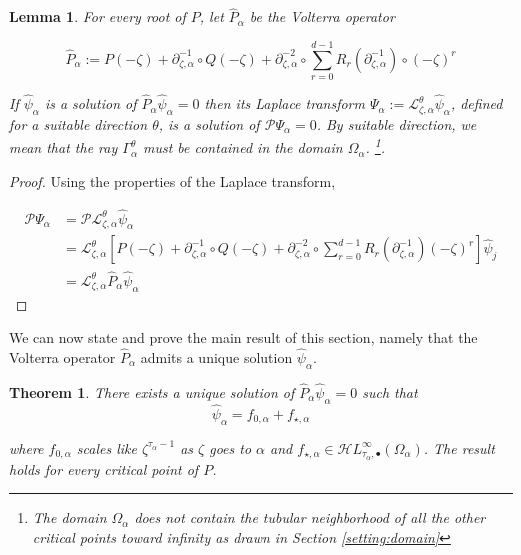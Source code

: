 \documentclass{article}
\theoremstyle{plain}
\newtheorem{lemma}{Lemma}
\newtheorem{thm}{Theorem}
\newcommand{\laplace}{\mathcal{L}}
\newcommand{\fracderiv}[3]{\partial^{#1}_{#2, #3}}
\newcommand{\singexp}[2]{\mathcal{H}L^\infty_{#1, #2}}
\newcommand{\singexpalg}[1]{\singexp{#1}{\bullet}}
\begin{document}
\begin{lemma}
 For every root of $P$, let $\hat{P}_{\alpha}$ be the Volterra operator 
 
\begin{equation}\label{P-hat_j}
\hat{P}_\alpha:=P(-\zeta)+\partial_{\zeta,\alpha}^{-1}\circ Q(-\zeta)+\partial_{\zeta,\alpha}^{-2}\circ\sum_{r=0}^{d-1}R_r(\partial_{\zeta,\alpha}^{-1})\circ (-\zeta)^r
\end{equation}
 
If $\hat{\psi}_\alpha$ is a solution of $\hat{P}_\alpha\hat{\psi}_\alpha=0$ then its Laplace transform $\Psi_\alpha:=\laplace_{\zeta,\alpha}^{\theta}\hat{\psi}_\alpha$, defined for a suitable direction $\theta$, is a solution of $\mathcal{P}\Psi_\alpha=0$. By suitable direction, we mean that the ray $\Gamma_{\alpha}^\theta$ must be contained in the domain $\Omega_{\alpha}$. \footnote{The domain $\Omega_{\alpha}$ does not contain the tubular neighborhood of all the other critical points toward infinity as drawn in Section \ref{setting:domain}}.      
\end{lemma}

\begin{proof}
Using the properties of the Laplace transform, 

    \begin{align*}
        \mathcal{P}\Psi_\alpha&=\mathcal{P}\laplace_{\zeta,\alpha}^{\theta}\hat{\psi}_\alpha\\
        &=\laplace_{\zeta,\alpha}^{\theta}\left[P(-\zeta)+\fracderiv{-1}{\zeta}{\alpha}\circ Q(-\zeta)+\fracderiv{-2}{\zeta}{\alpha}\circ\sum_{r=0}^{d-1}R_r(\fracderiv{-1}{\zeta}{\alpha})(-\zeta)^r\right]\hat{\psi}_j\\
        &=\laplace_{\zeta,\alpha}^{\theta}\hat{P}_\alpha\hat{\psi}_\alpha
    \end{align*}
\end{proof}

We can now state and prove the main result of this section, namely that the Volterra operator $\hat{P}_\alpha$ admits a unique solution $\hat{\psi}_\alpha$. %

\begin{thm}\label{thm:example}
    There exists a unique solution of $\hat{P}_\alpha\hat{\psi}_\alpha=0$ such that 
    \[\hat{\psi}_\alpha = f_{0,\alpha}+ f_{\star,\alpha}\]

    where $f_{0,\alpha}$ scales like $\zeta^{\tau_\alpha-1}$ as $\zeta$ goes to $\alpha$ and $f_{\star,\alpha}\in\singexpalg{\tau_\alpha}(\Omega_\alpha)$. The result holds for every critical point of $P$. 
\end{thm}
\end{document}
